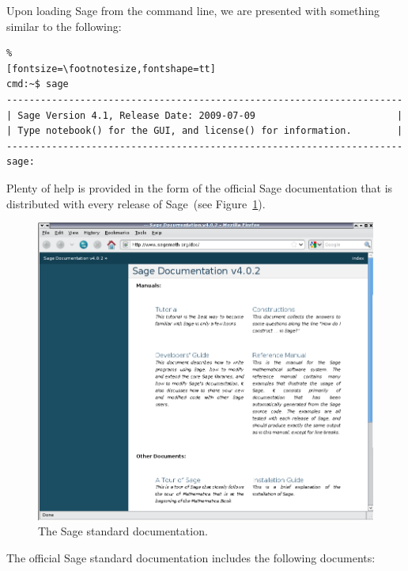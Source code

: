 Upon loading Sage from the command line, we are presented with
something similar to the following:
%
\begin{Verbatim}%
[fontsize=\footnotesize,fontshape=tt]
cmd:~$ sage
----------------------------------------------------------------------
| Sage Version 4.1, Release Date: 2009-07-09                         |
| Type notebook() for the GUI, and license() for information.        |
----------------------------------------------------------------------
sage:
\end{Verbatim}
%
Plenty of help is provided in the form of the official Sage
documentation that is distributed with every release of Sage~(see
Figure~\ref{fig:sage_standard_doc}).
%
\begin{figure}[!htpb]
\centering
\includegraphics[scale=0.4]{figures/sage-online-doc}
\caption{The Sage standard documentation.}
\label{fig:sage_standard_doc}
\end{figure}
%
The official Sage standard documentation includes the following documents:

